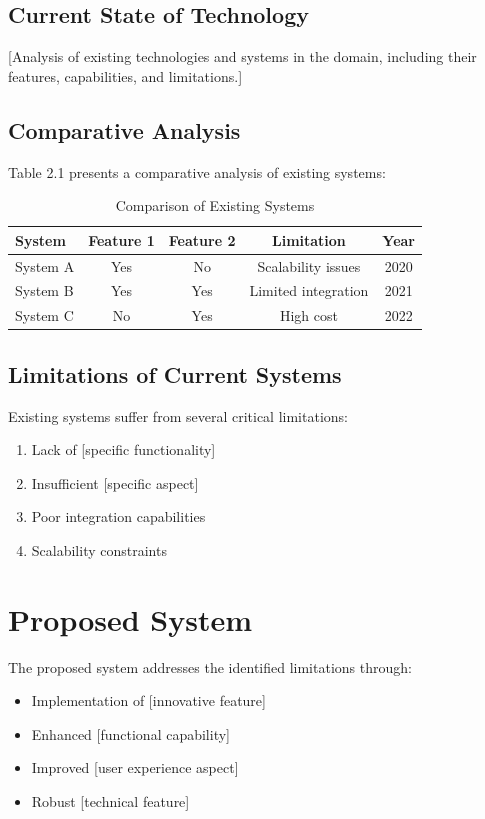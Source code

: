 \documentclass[12pt,twoside]{report}
\begin{document}
\subsection{Current State of Technology}
[Analysis of existing technologies and systems in the domain, including their features, capabilities, and limitations.]

\subsection{Comparative Analysis}
Table 2.1 presents a comparative analysis of existing systems:

\begin{table}[h]
\centering
\begin{tabular}{|l|c|c|c|c|}
\hline
\textbf{System} & \textbf{Feature 1} & \textbf{Feature 2} & \textbf{Limitation} & \textbf{Year} \\
\hline
System A & Yes & No & Scalability issues & 2020 \\
System B & Yes & Yes & Limited integration & 2021 \\
System C & No & Yes & High cost & 2022 \\
\hline
\end{tabular}
\caption{Comparison of Existing Systems}
\end{table}

\subsection{Limitations of Current Systems}
Existing systems suffer from several critical limitations:
\begin{enumerate}
    \item Lack of [specific functionality]
    \item Insufficient [specific aspect]
    \item Poor integration capabilities
    \item Scalability constraints
\end{enumerate}

\section{Proposed System}
The proposed system addresses the identified limitations through:
\begin{itemize}
    \item Implementation of [innovative feature]
    \item Enhanced [functional capability]
    \item Improved [user experience aspect]
    \item Robust [technical feature]
\end{itemize}
\end{document}
